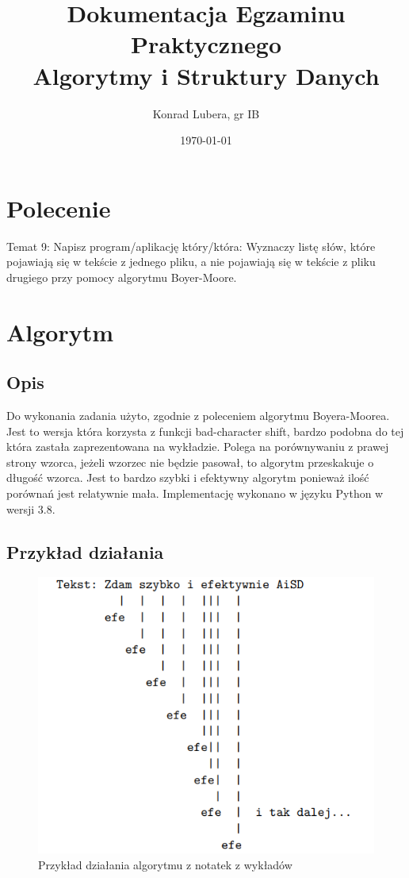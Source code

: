 \documentclass[12pt,a4paper]{article}
\begin{document}
\title{Dokumentacja Egzaminu Praktycznego\\ Algorytmy i Struktury Danych}
\author{Konrad Lubera, gr IB}
\date{\today}

\maketitle

\newpage
\tableofcontents

\newpage
\section{Polecenie}
Temat 9: Napisz program/aplikację który/która: Wyznaczy listę słów, które pojawiają się w tekście z jednego pliku, a nie pojawiają się w tekście z pliku drugiego przy pomocy algorytmu Boyer-Moore.

\section{Algorytm}
\subsection{Opis}
Do wykonania zadania użyto, zgodnie z poleceniem algorytmu Boyera-Moorea. Jest to wersja która korzysta z funkcji bad-character shift, bardzo podobna do tej która zastała zaprezentowana na wykładzie. Polega na porównywaniu z prawej strony wzorca, jeżeli wzorzec nie będzie pasował, to algorytm przeskakuje o długość wzorca. Jest to bardzo szybki i efektywny algorytm ponieważ ilość porównań jest relatywnie mała. 
\BlankLine
Implementację wykonano w języku Python w wersji 3.8.
\subsection{Przykład działania}
\begin{figure}[h]
\centering
\includegraphics[scale=0.75]{przyklad.png}
\caption{Przykład działania algorytmu z notatek z wykładów}
\label{fig:przykład}
\end{figure}
\newpage
\end{document}
